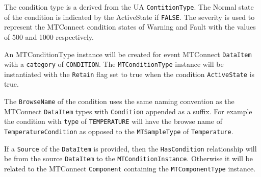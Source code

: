 \FloatBarrier

The condition type is a derived from the UA \texttt{ContitionType}. The Normal state of 
the condition is indicated by the ActiveState if \texttt{FALSE}. The severity 
is used to represent the MTConnect condition states of Warning and Fault with the values of
500 and 1000 respectively. 

An MTConditionType instance will be created for event MTConnect \texttt{DataItem} with a 
\texttt{category} of \texttt{CONDITION}. The \texttt{MTConditionType} instance will be instantiated 
with the \texttt{Retain} flag set to true when the condition \texttt{ActiveState} is true. 

The \texttt{BrowseName} of the condition uses the same naming convention as the  MTConnect
\texttt{DataItem} types with \texttt{Condition} appended as a suffix. For example the 
condition with \texttt{type} of \texttt{TEMPERATURE} will have the browse name of 
\texttt{TemperatureCondition} as opposed to the \texttt{MTSampleType} of \texttt{Temperature}.


If a \texttt{Source} of the \texttt{DataItem} is provided, then the \texttt{HasCondition} relationship 
will be from the source \texttt{DataItem} to the \texttt{MTConditionInstance}. Otherwise it will be 
related to the MTConnect \texttt{Component} containing the \texttt{MTComponentType} instance.


